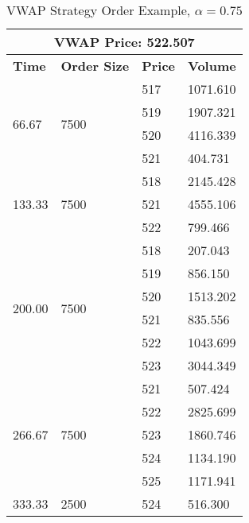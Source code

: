 \begin{table}[htbp]
\begin{center}
\caption{VWAP Strategy Order Example, $\alpha = 0.75$} \label{tab:vwap_order}
\begin{tabular}{l|l|l|l}
\hline \hline
\multicolumn{4}{c}{\textbf{VWAP Price}: 522.507}                                      \\
\hline
\textbf{Time}                    & \textbf{Order Size}        & \textbf{Price} & \textbf{Volume}   \\
\hline
\multirow{4}{*}{66.67}  & \multirow{4}{*}{7500} & 517 & 1071.610 \\
                        &                       & 519 & 1907.321 \\
                        &                       & 520 & 4116.339 \\
                        &                       & 521 & 404.731  \\
\hline
\multirow{3}{*}{133.33} & \multirow{3}{*}{7500} & 518 & 2145.428 \\
                        &                       & 521 & 4555.106 \\
                        &                       & 522 & 799.466  \\
\hline
\multirow{6}{*}{200.00} & \multirow{6}{*}{7500} & 518 & 207.043  \\
                        &                       & 519 & 856.150  \\
                        &                       & 520 & 1513.202 \\
                        &                       & 521 & 835.556  \\
                        &                       & 522 & 1043.699 \\
                        &                       & 523 & 3044.349 \\
\hline
\multirow{5}{*}{266.67} & \multirow{5}{*}{7500} & 521 & 507.424  \\
                        &                       & 522 & 2825.699 \\
                        &                       & 523 & 1860.746 \\
                        &                       & 524 & 1134.190 \\
                        &                       & 525 & 1171.941 \\
\hline
\multirow{3}{*}{333.33} & \multirow{3}{*}{2500} & 524 & 516.300  \\

\end{tabular}
\end{center}
\end{table}
